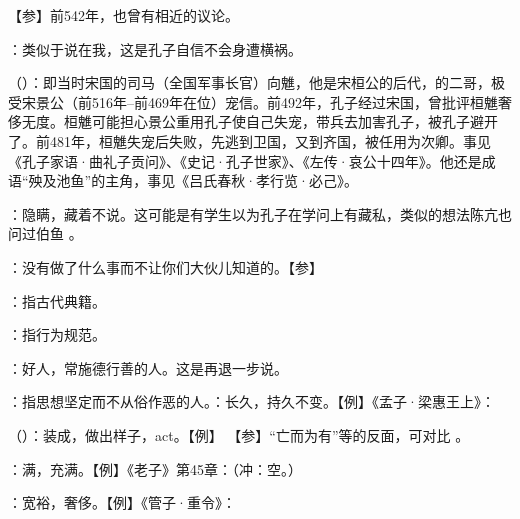 {
【参】前542年，也曾有相近的议论。
}
{}


{
\item {}：类似于说在我，这是孔子自信不会身遭横祸。

\item {}（）：即当时宋国的司马（全国军事长官）向魋，他是宋桓公的后代，的二哥，极受宋景公（前516年--前469年在位）宠信。前492年，孔子经过宋国，曾批评桓魋奢侈无度。桓魋可能担心景公重用孔子使自己失宠，带兵去加害孔子，被孔子避开了。前481年，桓魋失宠后失败，先逃到卫国，又到齐国，被任用为次卿。事见《孔子家语·曲礼子贡问》、《史记·孔子世家》、《左传·哀公十四年》。他还是成语“殃及池鱼”的主角，事见《吕氏春秋·孝行览·必己》。%
}
{}


{
\item {}：隐瞒，藏着不说。这可能是有学生以为孔子在学问上有藏私，类似的想法陈亢也问过伯鱼 。
\item {}：没有做了什么事而不让你们大伙儿知道的。【参】
}
{}


{
\item {}：指古代典籍。
\item {}：指行为规范。
}
{}


{
\item {}：好人，常施德行善的人。这是再退一步说。
\item {}：指思想坚定而不从俗作恶的人。：长久，持久不变。【例】《孟子·梁惠王上》：
\item {}（）：装成，做出样子，act。【例】   【参】“亡而为有”等的反面，可对比 。
\item {}：满，充满。【例】《老子》第45章：（冲：空。）
\item {}：宽裕，奢侈。【例】《管子·重令》：
}
{}


